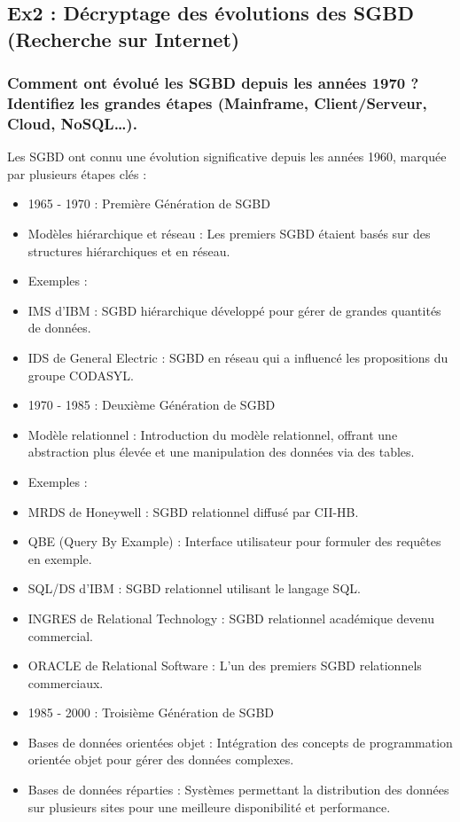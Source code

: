 \documentclass{article}
\begin{document}
\subsection{Ex2 : Décryptage des évolutions des SGBD (Recherche sur Internet)}
\subsubsection{Comment ont évolué les SGBD depuis les années 1970 ? Identifiez les grandes étapes (Mainframe, 
Client/Serveur, Cloud, NoSQL…).}

Les SGBD ont connu une évolution significative depuis les années 1960, marquée par plusieurs étapes clés :
\begin{itemize}
  \item 1965 - 1970 : Première Génération de SGBD
  \item Modèles hiérarchique et réseau : Les premiers SGBD étaient basés sur des structures hiérarchiques et en réseau.
  \item Exemples :
  \item IMS d’IBM : SGBD hiérarchique développé pour gérer de grandes quantités de données.
  \item IDS de General Electric : SGBD en réseau qui a influencé les propositions du groupe CODASYL.
  \item 1970 - 1985 : Deuxième Génération de SGBD
  \item Modèle relationnel : Introduction du modèle relationnel, offrant une abstraction plus élevée et une manipulation des données via des tables.
  \item Exemples :
  \item MRDS de Honeywell : SGBD relationnel diffusé par CII-HB.
  \item QBE (Query By Example) : Interface utilisateur pour formuler des requêtes en exemple.
  \item SQL/DS d’IBM : SGBD relationnel utilisant le langage SQL.
  \item INGRES de Relational Technology : SGBD relationnel académique devenu commercial.
  \item ORACLE de Relational Software : L’un des premiers SGBD relationnels commerciaux.
  \item 1985 - 2000 : Troisième Génération de SGBD
  \item Bases de données orientées objet : Intégration des concepts de programmation orientée objet pour gérer des données complexes.
  \item Bases de données réparties : Systèmes permettant la distribution des données sur plusieurs sites pour une meilleure disponibilité et performance.

\end{itemize}
\end{document}
